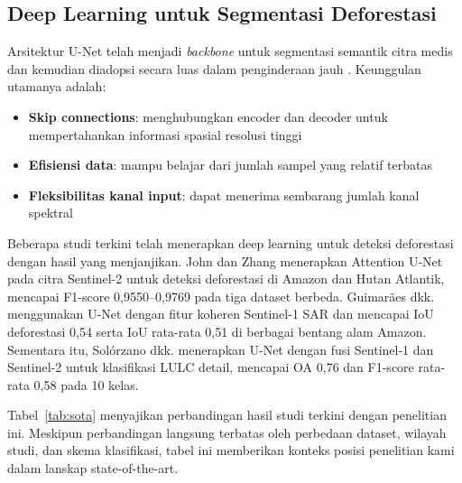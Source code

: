 \documentclass[12pt,a4paper]{article}
\begin{document}
\subsection{Deep Learning untuk Segmentasi Deforestasi}
\label{subsec:dl}

Arsitektur U-Net \cite{ronneberger2015unet} telah menjadi \textit{backbone}
untuk segmentasi semantik citra medis dan kemudian diadopsi secara luas dalam
penginderaan jauh \cite{zhu2017deep}. Keunggulan utamanya adalah:

\begin{itemize}[nosep]
    \item \textbf{Skip connections}: menghubungkan encoder dan decoder untuk
          mempertahankan informasi spasial resolusi tinggi
    \item \textbf{Efisiensi data}: mampu belajar dari jumlah sampel yang relatif
          terbatas
    \item \textbf{Fleksibilitas kanal input}: dapat menerima sembarang jumlah
          kanal spektral
\end{itemize}

Beberapa studi terkini telah menerapkan deep learning untuk deteksi
deforestasi dengan hasil yang menjanjikan. John dan Zhang
\cite{john2022attention} menerapkan Attention U-Net pada citra
Sentinel-2 untuk deteksi deforestasi di Amazon dan Hutan Atlantik,
mencapai F1-score 0,9550--0,9769 pada tiga dataset berbeda.
Guimarães dkk. \cite{guimaraes2025deep} menggunakan U-Net dengan
fitur koheren Sentinel-1 SAR dan mencapai IoU deforestasi 0,54
serta IoU rata-rata 0,51 di berbagai bentang alam Amazon.
Sementara itu, Solórzano dkk. \cite{solorzano2021lulc} menerapkan U-Net
dengan fusi Sentinel-1 dan Sentinel-2 untuk klasifikasi LULC
detail, mencapai OA 0,76 dan F1-score rata-rata 0,58 pada 10 kelas.

Tabel~\ref{tab:sota} menyajikan perbandingan hasil studi terkini
dengan penelitian ini. Meskipun perbandingan langsung terbatas
oleh perbedaan dataset, wilayah studi, dan skema klasifikasi,
tabel ini memberikan konteks posisi penelitian kami dalam lanskap
state-of-the-art.
\end{document}
